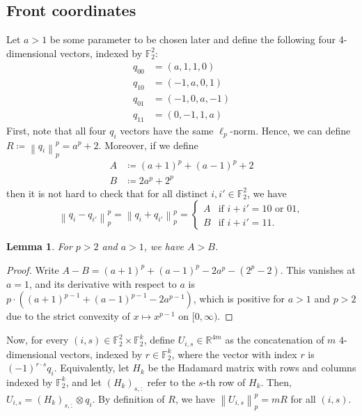 \documentclass[11pt,reqno]{amsart}
\theoremstyle{plain}
\newtheorem{lemma}[theorem]{Lemma}
\theoremstyle{definition}
\theoremstyle{remark}
\newcommand{\F}{\mathbb{F}}
\newcommand{\R}{\mathbb{R}}
\newcommand{\norm}[1]{\left\lVert #1 \right\rVert}
\numberwithin{equation}{section}
\begin{document}
\subsection{Front coordinates}
Let $a>1$ be some parameter to be chosen later and define the following four 4-dimensional vectors, indexed by $\F_2^2$:
\begin{align*}
    q_{00}&=(a,1,1,0) \\
    q_{10}&=(-1,a,0,1) \\
    q_{01}&=(-1,0,a,-1) \\
    q_{11}&=(0,-1,1,a)
\end{align*}
First, note that all four $q_i$ vectors have the same $\ell_p$-norm. Hence, we can define $R\coloneqq \norm{q_i}_p^p=a^p+2$. Moreover, if we define
\begin{align*}
    A &\coloneqq (a+1)^p+(a-1)^p+2 \\
    B &\coloneqq 2a^p+2^p
\end{align*}
then it is not hard to check that for all distinct $i,i'\in\F_2^2$, we have
\begin{equation}\label{eq:sign-blind}
\norm{q_i-q_{i'}}_p^p=\norm{q_i+q_{i'}}_p^p=
\begin{cases}
A & \text{if } i+i'=10\text{ or }01,\\
B & \text{if } i+i'=11 .
\end{cases}
\end{equation}

\begin{lemma}\label{lem:AB}
For $p>2$ and $a>1$, we have $A>B$.
\end{lemma}

\begin{proof}
Write $A-B=(a+1)^p+(a-1)^p-2a^p-(2^p-2)$. This vanishes at $a=1$, and its derivative with respect to $a$ is $p\cdot\left((a+1)^{p-1}+(a-1)^{p-1}-2a^{p-1}\right)$, which is positive for $a>1$ and $p>2$ due to the strict convexity of $x\mapsto x^{p-1}$ on $[0,\infty)$.
\end{proof}

Now, for every $(i,s)\in\F_2^2\times\F_2^k$, define $U_{i,s}\in\R^{4m}$ as the concatenation of $m$ $4$-dimensional vectors, indexed by $r\in\F_2^k$, where the vector with index $r$ is $(-1)^{r\cdot s}q_i$. Equivalently, let $H_k$ be the Hadamard matrix with rows and columns indexed by $\F_2^k$, and let $(H_k)_{s,:}$ refer to the $s$-th row of $H_k$. Then, $U_{i,s}=(H_k)_{s,:}\otimes q_i$. By definition of $R$, we have $\norm{U_{i,s}}_p^p=mR$ for all $(i,s)$.
\end{document}
